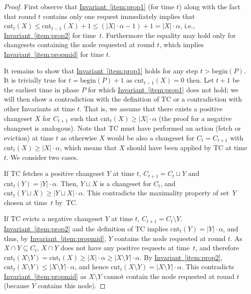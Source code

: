 \documentclass[sigconf,screen=true]{acmart}
\newcommand{\lref}[2][]{\hyperref[#2]{#1~\ref*{#2}}}
\newcommand{\ALG}{\textsc{TC}\xspace}
\newcommand{\cnt}{\textrm{cnt}}
\newcommand{\beP}{\textrm{begin}(P)}
\begin{document}
\begin{proof}
First observe that \lref[Invariant]{item:prop1} (for time $t$) along with the
fact that round $t$ contains only one request immediately implies that
$\cnt_t(X) \leq \cnt_{t-1}(X) + 1 \leq (|X| \cdot \alpha - 1) + 1 = |X|
\cdot \alpha$, i.e., \lref[Invariant]{item:prop2} for time~$t$. Furthermore the equality may
hold only for changesets containing the node requested at round $t$, which
implies \lref[Invariant]{item:propmid} for time $t$.

It remains to show that \lref[Invariant]{item:prop1} holds for any step $t >
\beP$. It is trivially true for $t = \beP+1$ 
as $\cnt_{t-1}(X) = 0$ then. Let $t+1$ be the earliest time in phase $P$ for
which \lref[Invariant]{item:prop1} does not hold; we will then show a
contradiction with the definition of \ALG or a contradiction with other
Invariants at time $t$. That is, we assume that there exists a positive
changeset $X$ for $C_{t+1}$ such that $\cnt_t(X) \geq |X| \cdot \alpha$ (the
proof for a negative changeset is analogous). Note that \ALG must have
performed an action (fetch or eviction) at time $t$ as otherwise $X$ would be
also  a changeset for $C_t = C_{t+1}$ with $\cnt_t(X) \geq |X| \cdot \alpha$,
which means that $X$ should have been applied by \ALG at time $t$. We consider
two cases.

If \ALG fetches a positive changeset $Y$ at time $t$, $C_{t+1} = C_t \sqcup Y$
and $\cnt_t(Y) = |Y|\cdot\alpha$. Then, $Y \sqcup X$ is a changeset for $C_t$,
and $\cnt_t(Y \sqcup X) \geq |Y \sqcup X| \cdot \alpha$. This contradicts
the maximality property of set~$Y$ chosen at time~$t$ by~\ALG.

If \ALG evicts a negative changeset $Y$ at time $t$, $C_{t+1} = C_t \setminus
Y$. \lref[Invariant]{item:prop2} and the definition of \ALG implies $\cnt_t(Y) =
|Y| \cdot \alpha$, and thus, by \lref[Invariant]{item:propmid}, $Y$ contains
the node requested at round $t$. As $X \cap Y \subseteq C_t$, \mbox{$X \cap Y$} does
not have any positive requests at time~$t$, and therefore $\cnt_t(X \setminus
Y) = \cnt_t(X) \geq |X| \cdot \alpha \geq |X \setminus Y| \cdot \alpha$. By
\lref[Invariant]{item:prop2}, $\cnt_t(X \setminus Y) \leq |X \setminus Y|
\cdot \alpha$, and hence $\cnt_t(X \setminus Y) = |X \setminus Y| \cdot
\alpha$. This contradicts \lref[Invariant]{item:propmid} as $X \setminus Y$
cannot contain the node requested at round $t$ (because $Y$ contains this
node).
\end{proof}
\end{document}
